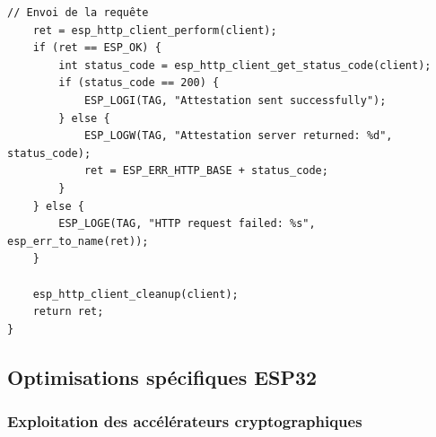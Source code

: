 \begin{lstlisting}[caption={Module d'attestation ESP32 optimisé}]
    // Envoi de la requête
    ret = esp_http_client_perform(client);
    if (ret == ESP_OK) {
        int status_code = esp_http_client_get_status_code(client);
        if (status_code == 200) {
            ESP_LOGI(TAG, "Attestation sent successfully");
        } else {
            ESP_LOGW(TAG, "Attestation server returned: %d", status_code);
            ret = ESP_ERR_HTTP_BASE + status_code;
        }
    } else {
        ESP_LOGE(TAG, "HTTP request failed: %s", esp_err_to_name(ret));
    }
    
    esp_http_client_cleanup(client);
    return ret;
}
\end{lstlisting}

\subsection{Optimisations spécifiques ESP32}

\subsubsection{Exploitation des accélérateurs cryptographiques}

